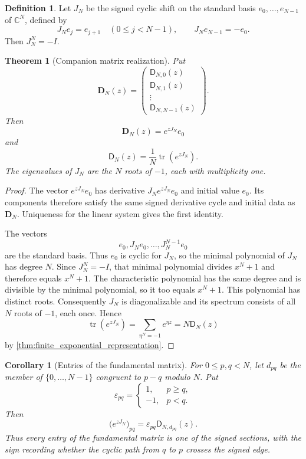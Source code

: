 \documentclass[11pt,letterpaper]{article}
\newtheorem{theorem}{Theorem}[section]
\newtheorem{corollary}[corollary]{Corollary}
\theoremstyle{definition}
\newtheorem{definition}[definition]{Definition}
\theoremstyle{remark}
\newcommand{\CC}{\mathbb C}
\newcommand{\Dfun}{\mathsf D}
\newcommand{\tr}{\operatorname{tr}}
\begin{document}
\begin{definition}\label{def:signed_shift_matrix}
Let $J_N$ be the signed cyclic shift on the standard basis $e_0,\ldots,e_{N-1}$ of $\CC^N$, defined by
\[
J_Ne_j=e_{j+1}
\quad (0\leq j<N-1),
\qquad
J_Ne_{N-1}=-e_0.
\]
Then $J_N^N=-I$.
\end{definition}

\begin{theorem}[Companion matrix realization]\label{thm:companion_matrix_realization}
Put
\[
\mathbf D_N(z)
=
\begin{pmatrix}
\Dfun_{N,0}(z)\\
\Dfun_{N,1}(z)\\
\vdots\\
\Dfun_{N,N-1}(z)
\end{pmatrix}.
\]
Then
\[
\mathbf D_N(z)=e^{zJ_N}e_0
\]
and
\[
\Dfun_N(z)=\frac1N\tr(e^{zJ_N}).
\]
The eigenvalues of $J_N$ are the $N$ roots of $-1$, each with multiplicity one.
\end{theorem}

\begin{proof}
The vector $e^{zJ_N}e_0$ has derivative $J_Ne^{zJ_N}e_0$ and initial value $e_0$.  Its components therefore satisfy the same signed derivative cycle and initial data as $\mathbf D_N$.  Uniqueness for the linear system gives the first identity.

The vectors
\[
e_0,J_Ne_0,\ldots,J_N^{N-1}e_0
\]
are the standard basis.  Thus $e_0$ is cyclic for $J_N$, so the
minimal polynomial of $J_N$ has degree $N$.  Since $J_N^N=-I$, that
minimal polynomial divides $x^N+1$ and therefore equals $x^N+1$.
The characteristic polynomial has the same degree and is divisible
by the minimal polynomial, so it too equals $x^N+1$.  This polynomial
has distinct roots.  Consequently $J_N$ is diagonalizable and its
spectrum consists of all $N$ roots of $-1$, each once.  Hence
\[
\tr(e^{zJ_N})
=
\sum_{\eta^N=-1}e^{\eta z}
=
N\Dfun_N(z)
\]
by \cref{thm:finite_exponential_representation}.
\end{proof}

\begin{corollary}[Entries of the fundamental matrix]\label{cor:fundamental_matrix_entries}
For $0\leq p,q<N$, let $d_{pq}$ be the member of $\{0,\ldots,N-1\}$ congruent to $p-q$ modulo $N$.  Put
\[
\varepsilon_{pq}
=
\begin{cases}
1,&p\geq q,\\
-1,&p<q.
\end{cases}
\]
Then
\[
\bigl(e^{zJ_N}\bigr)_{pq}
=
\varepsilon_{pq}\Dfun_{N,d_{pq}}(z).
\]
Thus every entry of the fundamental matrix is one of the signed sections, with the sign recording whether the cyclic path from $q$ to $p$ crosses the signed edge.
\end{corollary}
\end{document}
